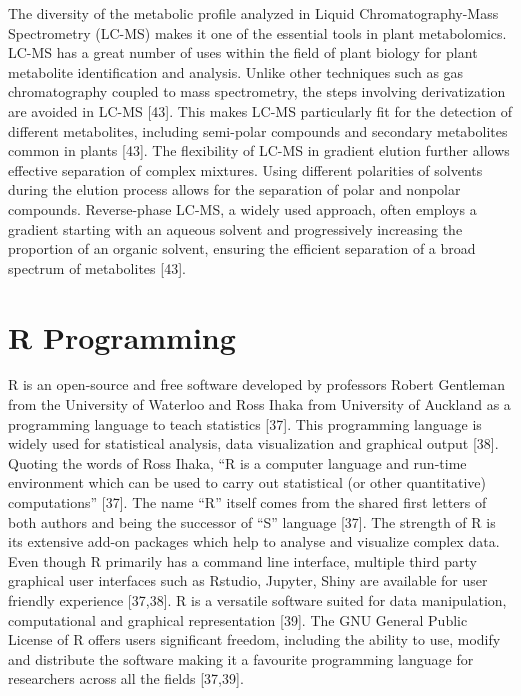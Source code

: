 \documentclass[12pt,a4paper]{report}
\begin{document}
The diversity of the metabolic profile analyzed in Liquid Chromatography-Mass Spectrometry (LC-MS) makes it one of the essential tools in plant metabolomics. LC-MS has a great number of uses within the field of plant biology for plant metabolite identification and analysis. Unlike other techniques such as gas chromatography coupled to mass spectrometry, 
the steps involving derivatization are avoided in LC-MS [43]. This makes LC-MS particularly fit for the detection of different metabolites, including semi-polar compounds and secondary metabolites common in plants [43]. The flexibility of LC-MS in gradient elution further allows effective separation of complex mixtures. Using different polarities of solvents 
during the elution process allows for the separation of polar and nonpolar compounds. Reverse-phase LC-MS, a widely used approach, often employs a gradient starting with an aqueous solvent and progressively increasing the proportion of an organic solvent, ensuring the efficient separation of a broad spectrum of metabolites [43]. \\


\section{R Programming}
R is an open-source and free software developed by professors Robert Gentleman from the University of Waterloo and Ross Ihaka from University of Auckland as a programming language to teach statistics [37]. This programming language 
is widely used for statistical analysis, data visualization and graphical output [38]. Quoting the words of Ross Ihaka, “R is a computer language and run-time environment which can be used to carry out statistical (or other quantitative) computations” [37]. 
The name “R” itself comes from the shared first letters of both authors and being the successor of “S” language [37]. The strength of R is its extensive add-on packages which help to analyse and visualize complex data. Even though R primarily has a command 
line interface, multiple third party graphical user interfaces such as Rstudio, Jupyter, Shiny are available for user friendly experience [37,38]. R is a versatile software suited for data manipulation, computational and graphical representation [39]. The GNU General 
Public License of R offers users significant freedom, including the ability to use, modify and distribute the software making it a favourite programming language for researchers across all the fields [37,39]. \\
\end{document}
